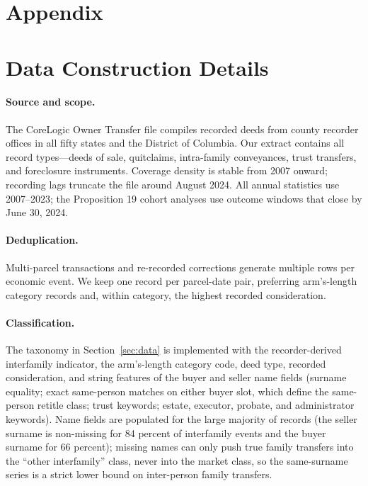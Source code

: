 \clearpage
\setcounter{table}{0}
\renewcommand{\thetable}{A\arabic{table}}
\setcounter{figure}{0}
\renewcommand{\thefigure}{A\arabic{figure}}

\section*{Appendix}

\section{Data Construction Details}\label{app:data}

\paragraph{Source and scope.} The CoreLogic Owner Transfer file compiles
recorded deeds from county recorder offices in all fifty states and the
District of Columbia. Our extract contains all record types---deeds of sale,
quitclaims, intra-family conveyances, trust transfers, and foreclosure
instruments. Coverage density is stable from 2007 onward; recording lags
truncate the file around August 2024. All annual statistics use 2007--2023;
the Proposition 19 cohort analyses use outcome windows that close by June 30,
2024.

\paragraph{Deduplication.} Multi-parcel transactions and re-recorded
corrections generate multiple rows per economic event. We keep one record per
parcel-date pair, preferring arm's-length category records and, within
category, the highest recorded consideration.

\paragraph{Classification.} The taxonomy in Section~\ref{sec:data} is
implemented with the recorder-derived interfamily indicator, the
arm's-length category code, deed type, recorded consideration, and
string features of the buyer and seller name fields (surname equality;
exact same-person matches on either buyer slot, which define the
same-person retitle class; trust keywords; estate, executor, probate, and
administrator keywords).
Name fields are populated for the large majority of records (the seller
surname is non-missing for 84 percent of interfamily events and the buyer
surname for 66 percent); missing names can only push true family transfers
into the ``other interfamily'' class, never into the market class, so the
same-surname series is a strict lower bound on inter-person family transfers.

